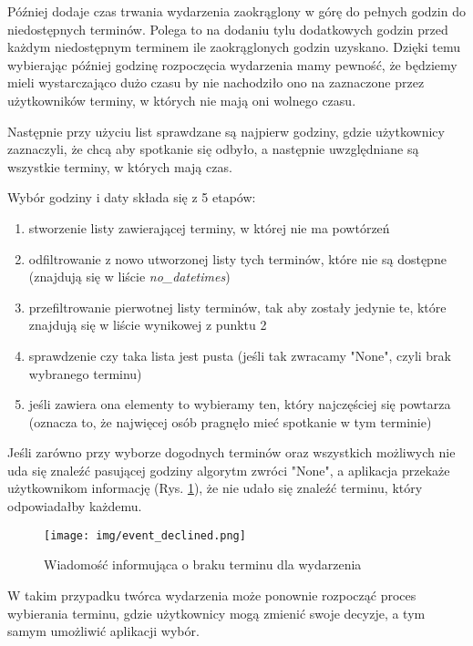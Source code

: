 \documentclass[12pt,a4paper]{article}
\begin{document}
Później dodaje czas trwania wydarzenia zaokrąglony w górę do pełnych godzin do niedostępnych terminów. Polega to na dodaniu tylu dodatkowych godzin przed każdym niedostępnym terminem ile zaokrąglonych godzin uzyskano. Dzięki temu wybierając później godzinę rozpoczęcia wydarzenia mamy pewność, że będziemy mieli wystarczająco dużo czasu by nie nachodziło ono na zaznaczone przez użytkowników terminy, w których nie mają oni wolnego czasu.

Następnie przy użyciu list sprawdzane są najpierw godziny, gdzie użytkownicy zaznaczyli, że chcą aby spotkanie się odbyło, a następnie uwzględniane są wszystkie terminy, w których mają czas.

Wybór godziny i daty składa się z 5 etapów:

\begin{enumerate}
    \item stworzenie listy zawierającej terminy, w której nie ma powtórzeń
    \item odfiltrowanie z nowo utworzonej listy tych terminów, które nie są dostępne (znajdują się w liście \textit{no\_datetimes})
    \item przefiltrowanie pierwotnej listy terminów, tak aby zostały jedynie te, które znajdują się w liście wynikowej z punktu 2
    \item sprawdzenie czy taka lista jest pusta (jeśli tak zwracamy "None", czyli brak wybranego terminu)
    \item jeśli zawiera ona elementy to wybieramy ten, który najczęściej się powtarza (oznacza to, że najwięcej osób pragnęło mieć spotkanie w tym terminie)
\end{enumerate}

Jeśli zarówno przy wyborze dogodnych terminów oraz wszystkich możliwych nie uda się znaleźć pasującej godziny algorytm zwróci "None", a aplikacja przekaże użytkownikom informację (Rys. \ref{img: event declined}), że nie udało się znaleźć terminu, który odpowiadałby każdemu. 

\begin{figure}[H]
    \centering
    \texttt{[image: img/event\_declined.png]}
    \caption{Wiadomość informująca o braku terminu dla wydarzenia}
    \label{img: event declined}
\end{figure}

W takim przypadku twórca wydarzenia może ponownie rozpocząć proces wybierania terminu, gdzie użytkownicy mogą zmienić swoje decyzje, a tym samym umożliwić aplikacji wybór.
\end{document}
